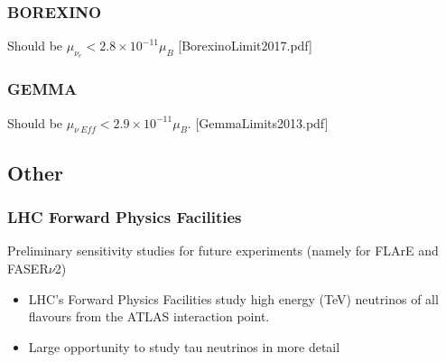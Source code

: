 \subsubsection{BOREXINO}
Should be $\mu_{\nu_e}<2.8\times 10^{-11}\mu_B$ 
[BorexinoLimit2017.pdf]

\subsubsection{GEMMA}
Should be $\mu_{\nu\ Eff}<2.9\times 10^{-11}\mu_B$. [GemmaLimits2013.pdf] 


\subsection{Other}
\subsubsection{LHC Forward Physics Facilities}
Preliminary sensitivity studies for future experiments (namely for FLArE and FASER$\nu$2)
\begin{itemize}
    \item LHC’s Forward Physics Facilities study high energy (TeV) neutrinos of all flavours from the ATLAS interaction point.
    \item Large opportunity to study tau neutrinos in more detail
\end{itemize}

